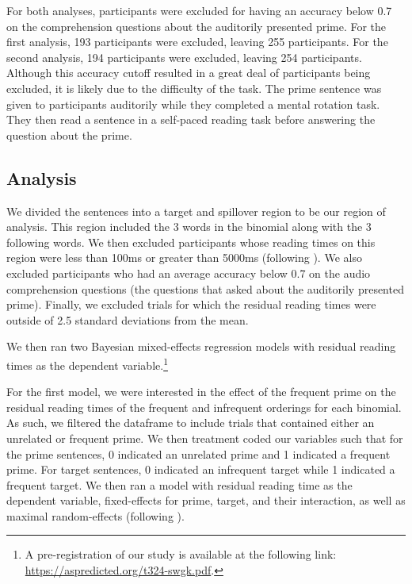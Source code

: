 \documentclass[
  12pt,
]{scrartcl}
\begin{document}
For both analyses, participants were excluded for having an accuracy
below 0.7 on the comprehension questions about the auditorily presented
prime. For the first analysis, 193 participants were excluded, leaving
255 participants. For the second analysis, 194 participants were
excluded, leaving 254 participants. Although this accuracy cutoff
resulted in a great deal of participants being excluded, it is likely
due to the difficulty of the task. The prime sentence was given to
participants auditorily while they completed a mental rotation task.
They then read a sentence in a self-paced reading task before answering
the question about the prime.

\subsection{Analysis}\label{analysis}

We divided the sentences into a target and spillover region to be our
region of analysis. This region included the 3 words in the binomial
along with the 3 following words. We then excluded participants whose
reading times on this region were less than 100ms or greater than 5000ms
(following ). We also excluded participants who had an average accuracy
below 0.7 on the audio comprehension questions (the questions that asked
about the auditorily presented prime). Finally, we excluded trials for
which the residual reading times were outside of 2.5 standard deviations
from the mean.

We then ran two Bayesian mixed-effects regression models with residual
reading times as the dependent variable.\footnote{A pre-registration of
  our study is available at the following link:
  \url{https://aspredicted.org/t324-swgk.pdf}.}

For the first model, we were interested in the effect of the frequent
prime on the residual reading times of the frequent and infrequent
orderings for each binomial. As such, we filtered the dataframe to
include trials that contained either an unrelated or frequent prime. We
then treatment coded our variables such that for the prime sentences, 0
indicated an unrelated prime and 1 indicated a frequent prime. For
target sentences, 0 indicated an infrequent target while 1 indicated a
frequent target. We then ran a model with residual reading time as the
dependent variable, fixed-effects for prime, target, and their
interaction, as well as maximal random-effects (following
).
\end{document}
